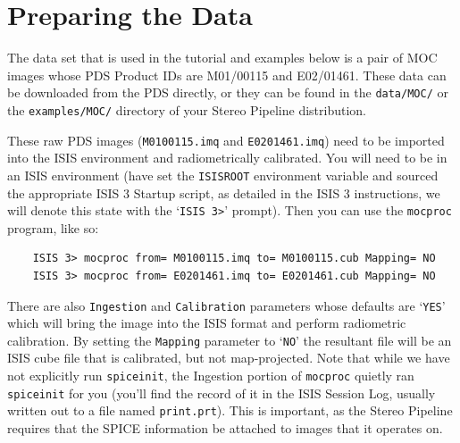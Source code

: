 \section{Preparing the Data}

The data set that is used in the tutorial and examples below is a
pair of \ac{MOC} \citep{1992JGR....97.7699M,2001JGR...10623429M}
images whose \ac{PDS} Product IDs are M01/00115 and E02/01461.
These data can be downloaded from the PDS directly, or they can be
found in the \texttt{data/MOC/} or the \texttt{examples/MOC/}
directory of your Stereo Pipeline distribution.

These raw \ac{PDS} images (\texttt{M0100115.imq} and \texttt{E0201461.imq})
need to be imported into the \ac{ISIS} environment and radiometrically
calibrated.  You will need to be in an \ac{ISIS} environment (have
set the \texttt{ISISROOT} environment variable and sourced the
appropriate \ac{ISIS} 3 Startup script, as detailed in the \ac{ISIS}
3 instructions, we will denote this state with the `\texttt{ISIS
3>}' prompt).  Then you can use the \texttt{mocproc} program, like
so:

\begin{verbatim}
    ISIS 3> mocproc from= M0100115.imq to= M0100115.cub Mapping= NO
    ISIS 3> mocproc from= E0201461.imq to= E0201461.cub Mapping= NO
\end{verbatim}

There are also \texttt{Ingestion} and \texttt{Calibration} parameters
whose defaults are `\texttt{YES}' which will bring the image into
the \ac{ISIS} format and perform radiometric calibration.  By setting
the \texttt{Mapping} parameter to `\texttt{NO}' the resultant file
will be an \ac{ISIS} cube file that is calibrated, but not
map-projected.  Note that while we have not explicitly run
\texttt{spiceinit}, the Ingestion portion of \texttt{mocproc} quietly
ran \texttt{spiceinit} for you (you'll find the record of it in the
\ac{ISIS} Session Log, usually written out to a file named
\texttt{print.prt}).  This is important, as the Stereo Pipeline
requires that the SPICE information be attached to images that it
operates on.


